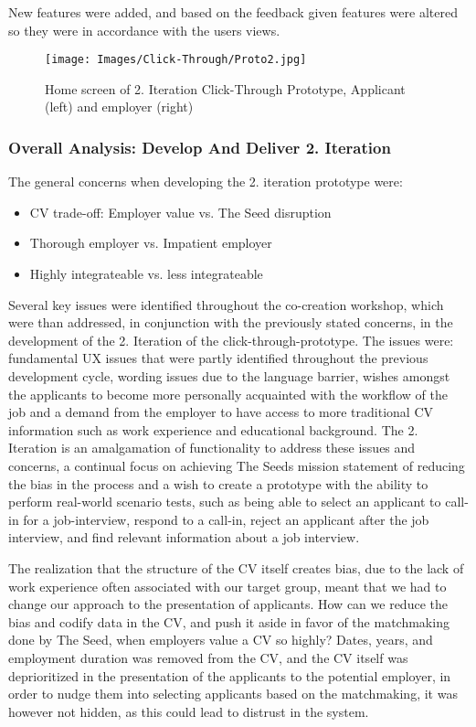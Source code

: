 New features were added, and based on the feedback given features were altered so they were in accordance with the users views.
\begin{figure}[H]
\centering
\caption{Home screen of 2. Iteration Click-Through Prototype, Applicant (left) and employer (right)}
\label{click-through1}
{\texttt{[image: Images/Click-Through/Proto2.jpg]}}
\end{figure}

\subsubsection{Overall Analysis: Develop And Deliver 2. Iteration}

The general concerns when developing the 2. iteration prototype were:
\begin{itemize}
    \item CV trade-off: Employer value vs. The Seed disruption
    \item Thorough employer vs. Impatient employer
    \item Highly integrateable vs. less integrateable
\end{itemize}

Several key issues were identified throughout the co-creation workshop, which were than addressed, in conjunction with the previously stated concerns, in the development of the 2. Iteration of the click-through-prototype. The issues were: fundamental UX issues that were partly identified throughout the previous development cycle, wording issues due to the language barrier, wishes amongst the applicants to become more personally acquainted with the workflow of the job and a demand from the employer to have access to more traditional CV information such as work experience and educational background. The 2. Iteration is an amalgamation of functionality to address these issues and concerns, a continual focus on achieving The Seeds mission statement of reducing the bias in the process and a wish to create a prototype with the ability to perform real-world scenario tests, such as being able to select an applicant to call-in for a job-interview, respond to a call-in, reject an applicant after the job interview, and find relevant information about a job interview. 

The realization that the structure of the CV itself creates bias, due to the lack of work experience often associated with our target group, meant that we had to change our approach to the presentation of applicants. How can we reduce the bias and codify data in the CV, and push it aside in favor of the matchmaking done by The Seed, when employers value a CV so highly? Dates, years, and employment duration was removed from the CV, and the CV itself was deprioritized in the presentation of the applicants to the potential employer, in order to nudge them into selecting applicants based on the matchmaking, it was however not hidden, as this could lead to distrust in the system.

